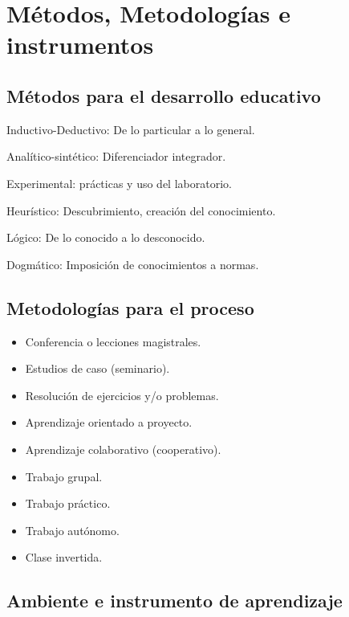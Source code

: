 \documentclass[a4pa<per,12pt,spanish]{article}
\newcommand{\cmark}{\ding{51}}%
\newcommand{\done}{\rlap{$\square$}{\raisebox{2pt}{\large\hspace{1pt}\cmark}}%
\hspace{-2.5pt}}
\begin{document}
\section{Métodos, Metodologías e instrumentos}
\label{sec:metod-metod-e}

\subsection{Métodos para el desarrollo educativo}
\label{sec:metodos-para-el}

\begin{todolist}
\item  [\done] Inductivo-Deductivo: De lo particular a lo general.
\item [\done] Analítico-sintético: Diferenciador integrador.
\item [\done] Experimental: prácticas y uso del laboratorio.
\item [\done] Heurístico: Descubrimiento, creación del conocimiento.
\item [\done] Lógico: De lo conocido a lo desconocido.
\item [\done] Dogmático: Imposición de conocimientos a normas.
\end{todolist}

\subsection{Metodologías para el proceso}
\label{sec:metodologias-para-el}

\begin{itemize}
\item [\done] Conferencia o lecciones magistrales.
\item [\done] Estudios de caso (seminario).
\item [\done] Resolución de ejercicios y/o problemas.
\item [\done] Aprendizaje orientado a proyecto.
\item [\done] Aprendizaje colaborativo (cooperativo).
\item [\done] Trabajo grupal.
\item [\done] Trabajo práctico.
\item [\done] Trabajo autónomo.
\item [\done] Clase invertida.

\end{itemize}

\subsection{Ambiente e instrumento de aprendizaje}
\label{sec:ambi-e-instr}
\end{document}
